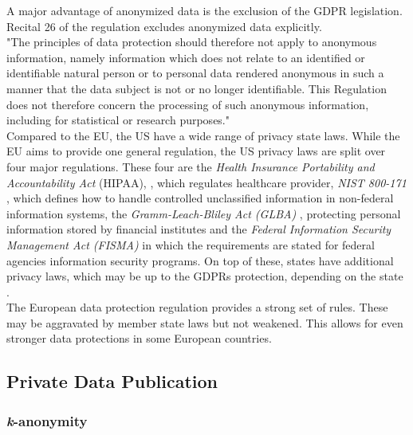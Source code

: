         A major advantage of anonymized data is the exclusion of the GDPR legislation. Recital 26 of the regulation excludes anonymized data explicitly.\\ 
        "The principles of data protection should therefore not apply to anonymous information, namely information which does not relate to an identified or identifiable natural person or to personal data rendered anonymous in such a manner that the data subject is not or no longer identifiable. This Regulation does not therefore concern the processing of such anonymous information, including for statistical or research purposes." \cite{european_union_regulation_2016}\\
        Compared to the EU, the US have a wide range of privacy state laws. While the EU aims to provide one general regulation, the US privacy laws are split over four major regulations.
        These four are the \textit{Health Insurance Portability and Accountability Act} (HIPAA), \cite{rights_ocr_summary_2009}, which regulates healthcare provider, \textit{NIST 800-171} \cite{ross_protecting_2015}, which defines how to handle controlled unclassified information in non-federal information systems, the \textit{Gramm-Leach-Bliley Act (GLBA)} \cite{noauthor_gramm-leach-bliley_2013}, protecting personal information stored by financial institutes and the \textit{Federal Information Security Management Act (FISMA)} \cite{carper_s2521_2014} in which the requirements are stated for federal agencies information security programs. On top of these, states have additional privacy laws, which may be up to the GDPRs protection, depending on the state \cite{andrada_coos_eu_nodate}.\\
        The European data protection regulation provides a strong set of rules. These may be aggravated by member state laws but not weakened. This allows for even stronger data protections in some European countries.
        
    \subsection{Private Data Publication}
        \label{subsec:related:private_data_analysis}
    
        \subsubsection{\textit{k}-anonymity}
        
